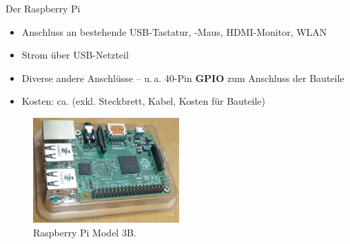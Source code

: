 \documentclass[usenames,dvipsnames]{beamer}
\begin{document}

%
%	
%


\begin{frame}{Der Raspberry Pi}
	\begin{itemize}
		\item Anschluss an bestehende USB-Tastatur, -Maus, HDMI-Monitor, WLAN
		\item Strom über USB-Netzteil
		\item Diverse andere Anschlüsse -- u.\,a. 40-Pin \textbf{GPIO} zum Anschluss der Bauteile
		\item Kosten: ca.  (exkl. Steckbrett, Kabel, Kosten für Bauteile)
	\end{itemize}

	\begin{figure}[ht]
		\centering
		\includegraphics[width=0.5\textwidth]{img/raspi-2b}
		\caption{Raspberry Pi Model 3B.}
	\end{figure}
\end{frame}

\end{document}
